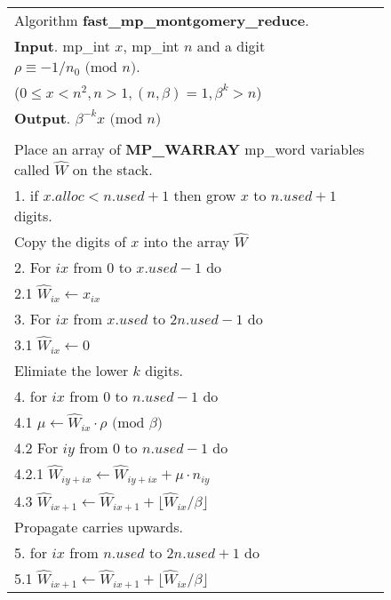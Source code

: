 \documentclass[b5paper]{book}
\begin{document}
\newpage\begin{figure}[!here]
\begin{small}
\begin{center}
\begin{tabular}{l}
\hline Algorithm \textbf{fast\_mp\_montgomery\_reduce}. \\
\textbf{Input}.   mp\_int $x$, mp\_int $n$ and a digit $\rho \equiv -1/n_0 \mbox{ (mod }n\mbox{)}$. \\
\hspace{11.5mm}($0 \le x < n^2, n > 1, (n, \beta) = 1, \beta^k > n$) \\
\textbf{Output}.  $\beta^{-k}x \mbox{ (mod }n\mbox{)}$ \\
\hline \\
Place an array of \textbf{MP\_WARRAY} mp\_word variables called $\hat W$ on the stack. \\
1.  if $x.alloc < n.used + 1$ then grow $x$ to $n.used + 1$ digits. \\
Copy the digits of $x$ into the array $\hat W$ \\
2.  For $ix$ from $0$ to $x.used - 1$ do \\
\hspace{3mm}2.1  $\hat W_{ix} \leftarrow x_{ix}$ \\
3.  For $ix$ from $x.used$ to $2n.used - 1$ do \\
\hspace{3mm}3.1  $\hat W_{ix} \leftarrow 0$ \\
Elimiate the lower $k$ digits. \\
4.  for $ix$ from $0$ to $n.used - 1$ do \\
\hspace{3mm}4.1  $\mu \leftarrow \hat W_{ix} \cdot \rho \mbox{ (mod }\beta\mbox{)}$ \\
\hspace{3mm}4.2  For $iy$ from $0$ to $n.used - 1$ do \\
\hspace{6mm}4.2.1  $\hat W_{iy + ix} \leftarrow \hat W_{iy + ix} + \mu \cdot n_{iy}$ \\
\hspace{3mm}4.3  $\hat W_{ix + 1} \leftarrow \hat W_{ix + 1} + \lfloor \hat W_{ix} / \beta \rfloor$ \\
Propagate carries upwards. \\
5.  for $ix$ from $n.used$ to $2n.used + 1$ do \\
\hspace{3mm}5.1  $\hat W_{ix + 1} \leftarrow \hat W_{ix + 1} + \lfloor \hat W_{ix} / \beta \rfloor$ \\

\end{tabular}
\end{center}
\end{small}
\end{figure}
\end{document}
